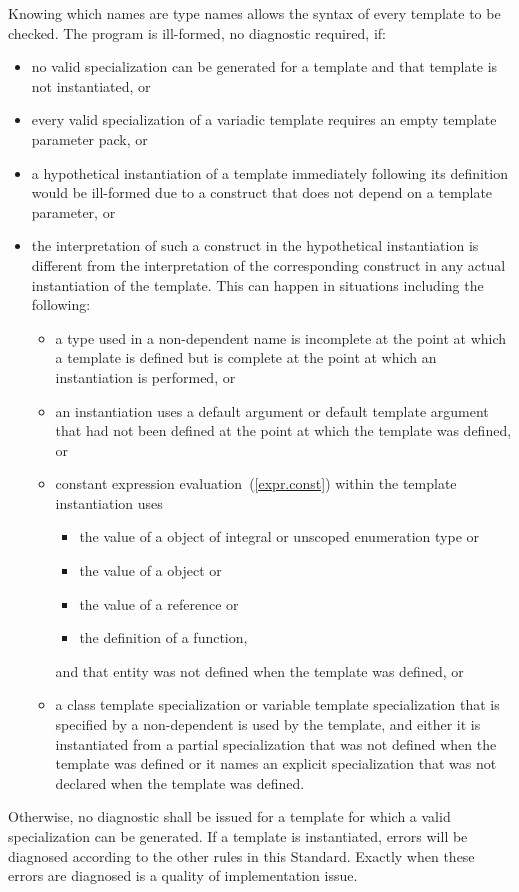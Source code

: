 \pnum
{}%
%
Knowing which names are type names allows the syntax of every template
to be checked.
The program is ill-formed, no diagnostic required, if:
\begin{itemize}
\item
no valid specialization can be generated for a template
and that template is not instantiated, or
\item
every valid specialization of a variadic template requires an empty template
parameter pack, or
\item
a hypothetical instantiation of a template
immediately following its definition
would be ill-formed
due to a construct that does not depend on a template parameter, or
\item
the interpretation of such a construct
in the hypothetical instantiation
is different from
the interpretation of the corresponding construct
in any actual instantiation of the template.
\enternote
This can happen in situations including the following:
\begin{itemize}
\item a type used in a non-dependent name is incomplete at the point at which a
template is defined but is complete at the point at which an instantiation is
performed, or

\item an instantiation uses a default argument or default template argument
that had not been defined at the point at which the template was defined, or

\item constant expression evaluation~(\ref{expr.const}) within the template
instantiation uses
  \begin{itemize}
  \item the value of a  object of integral or unscoped enumeration type or
  \item the value of a  object or
  \item the value of a reference or
  \item the definition of a  function,
  \end{itemize}
and that entity was not defined when the template was defined, or

\item a class template specialization or variable template specialization that
is specified by a non-dependent  is used by
the template, and either it is instantiated from a partial specialization that
was not defined when the template was defined or it names an explicit
specialization that was not declared when the template was defined.
\end{itemize}
\exitnote
\end{itemize}
Otherwise, no diagnostic shall be issued for a template
for which a valid specialization can be generated.
\enternote
If a template is instantiated, errors will be diagnosed according
to the other rules in this Standard.
Exactly when these errors are diagnosed is a quality of implementation issue.
\exitnote
\enterexample

